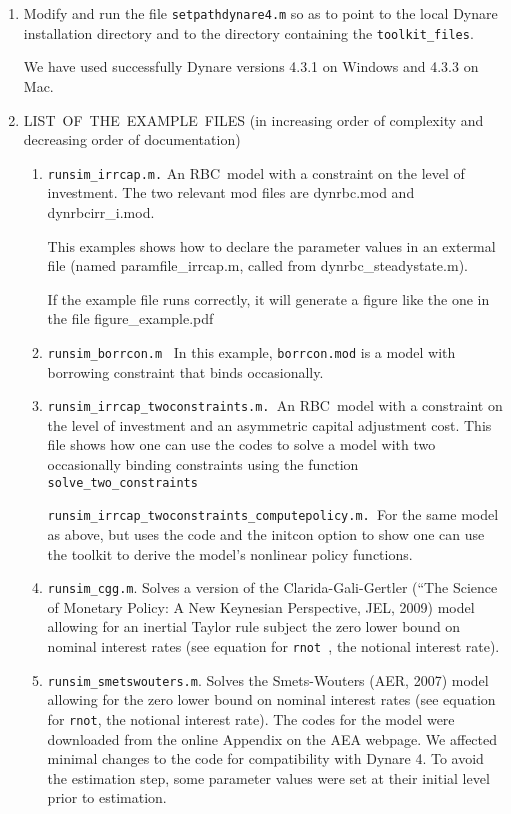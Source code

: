 \documentclass[12pt]{article}
\begin{document}
\begin{enumerate}
\item Modify and run the file \texttt{setpathdynare4.m} so as to point to
the local Dynare installation directory and to the directory containing the 
\texttt{toolkit\_files}.

We have used successfully Dynare versions 4.3.1 on Windows and 4.3.3 on Mac.

\item LIST\ OF\ THE\ EXAMPLE\ FILES (in increasing order of complexity and
decreasing order of documentation)

\begin{enumerate}
\item \texttt{runsim\_irrcap.m.} An RBC\ model with a constraint on the
level of investment. The two relevant mod files are dynrbc.mod and
dynrbcirr\_i.mod.

This examples shows how to declare the parameter values in an extermal file
(named paramfile\_irrcap.m, called from dynrbc\_steadystate.m).

If the example file runs correctly, it will generate a figure like the one
in the file figure\_example.pdf

\item \texttt{runsim\_borrcon.m} \ In this example, \texttt{borrcon.mod} is
a model with borrowing constraint that binds occasionally.

\item \texttt{runsim\_irrcap\_twoconstraints.m. }An RBC\ model with a
constraint on the level of investment and an asymmetric capital adjustment
cost. This file shows how one can use the codes to solve a model with two
occasionally binding constraints using the function \texttt{%
solve\_two\_constraints}

\texttt{runsim\_irrcap\_twoconstraints\_computepolicy.m. }For the same model
as above, but uses the code and the initcon option to show one can use the
toolkit to derive the model's nonlinear policy functions.

\item \texttt{runsim\_cgg.m}. Solves a version of the Clarida-Gali-Gertler
(\textquotedblleft The Science of Monetary Policy: A New Keynesian
Perspective, JEL, 2009) model allowing for an inertial Taylor rule subject
the zero lower bound on nominal interest rates (see equation for \texttt{rnot%
}, the notional interest rate).

\item \texttt{runsim\_smetswouters.m}. Solves the Smets-Wouters (AER, 2007)
model allowing for the zero lower bound on nominal interest rates (see
equation for \texttt{rnot}, the notional interest rate). The codes for the
model were downloaded from the online Appendix on the AEA webpage. We
affected minimal changes to the code for compatibility with Dynare 4. To
avoid the estimation step, some parameter values were set at their initial
level prior to estimation.


\end{enumerate}
\end{enumerate}
\end{document}
